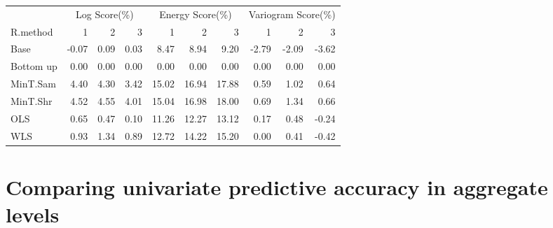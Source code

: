 \documentclass[]{article}
\begin{document}
\begin{table}[H]
\centering
\begin{tabular}{l|r|r|r|r|r|r|r|r|r}
\hline
\multicolumn{1}{c|}{ } & \multicolumn{3}{c|}{Log Score(\%)} & \multicolumn{3}{c|}{Energy Score(\%)} & \multicolumn{3}{c}{Variogram Score(\%)} \\
\cline{2-4} \cline{5-7} \cline{8-10}
R.method & 1 & 2 & 3 & 1 & 2 & 3 & 1 & 2 & 3\\
\hline
Base & -0.07 & 0.09 & 0.03 & 8.47 & 8.94 & 9.20 & -2.79 & -2.09 & -3.62\\
\hline
Bottom up & 0.00 & 0.00 & 0.00 & 0.00 & 0.00 & 0.00 & 0.00 & 0.00 & 0.00\\
\hline
MinT.Sam & 4.40 & 4.30 & 3.42 & 15.02 & 16.94 & 17.88 & 0.59 & 1.02 & 0.64\\
\hline
MinT.Shr & 4.52 & 4.55 & 4.01 & 15.04 & 16.98 & 18.00 & 0.69 & 1.34 & 0.66\\
\hline
OLS & 0.65 & 0.47 & 0.10 & 11.26 & 12.27 & 13.12 & 0.17 & 0.48 & -0.24\\
\hline
WLS & 0.93 & 1.34 & 0.89 & 12.72 & 14.22 & 15.20 & 0.00 & 0.41 & -0.42\\
\hline
\end{tabular}
\end{table}

\section{Comparing univariate predictive accuracy in aggregate
levels}\label{comparing-univariate-predictive-accuracy-in-aggregate-levels}
\end{document}
